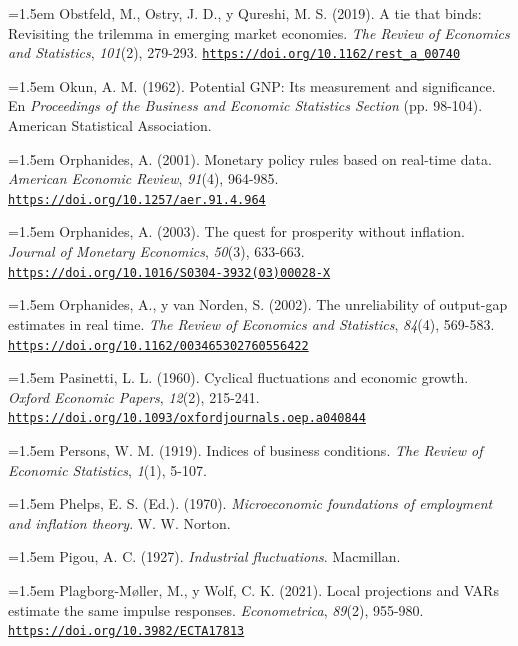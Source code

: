 \documentclass[10pt,a4paper]{article}
\begin{document}
\noindent\hangindent=1.5em Obstfeld, M., Ostry, J. D., y Qureshi, M. S. (2019). A tie that binds: Revisiting the trilemma in emerging market economies. \textit{The Review of Economics and Statistics}, \textit{101}(2), 279-293. \href{https://doi.org/10.1162/rest_a_00740}{\nolinkurl{https://doi.org/10.1162/rest_a_00740}}

\noindent\hangindent=1.5em Okun, A. M. (1962). Potential GNP: Its measurement and significance. En \textit{Proceedings of the Business and Economic Statistics Section} (pp. 98-104). American Statistical Association.

\noindent\hangindent=1.5em Orphanides, A. (2001). Monetary policy rules based on real-time data. \textit{American Economic Review}, \textit{91}(4), 964-985. \href{https://doi.org/10.1257/aer.91.4.964}{\nolinkurl{https://doi.org/10.1257/aer.91.4.964}}

\noindent\hangindent=1.5em Orphanides, A. (2003). The quest for prosperity without inflation. \textit{Journal of Monetary Economics}, \textit{50}(3), 633-663. \href{https://doi.org/10.1016/S0304-3932(03)00028-X}{\nolinkurl{https://doi.org/10.1016/S0304-3932(03)00028-X}}

\noindent\hangindent=1.5em Orphanides, A., y van Norden, S. (2002). The unreliability of output-gap estimates in real time. \textit{The Review of Economics and Statistics}, \textit{84}(4), 569-583. \href{https://doi.org/10.1162/003465302760556422}{\nolinkurl{https://doi.org/10.1162/003465302760556422}}

{\sloppy\noindent\hangindent=1.5em Pasinetti, L. L. (1960). Cyclical fluctuations and economic growth. \textit{Oxford Economic Papers}, \textit{12}(2), 215-241. \href{https://doi.org/10.1093/oxfordjournals.oep.a040844}{\nolinkurl{https://doi.org/10.1093/oxfordjournals.oep.a040844}}\par}

\noindent\hangindent=1.5em Persons, W. M. (1919). Indices of business conditions. \textit{The Review of Economic Statistics}, \textit{1}(1), 5-107.

\noindent\hangindent=1.5em Phelps, E. S. (Ed.). (1970). \textit{Microeconomic foundations of employment and inflation theory}. W. W. Norton.

\noindent\hangindent=1.5em Pigou, A. C. (1927). \textit{Industrial fluctuations}. Macmillan.

\noindent\hangindent=1.5em Plagborg-Møller, M., y Wolf, C. K. (2021). Local projections and VARs estimate the same impulse responses. \textit{Econometrica}, \textit{89}(2), 955-980. \href{https://doi.org/10.3982/ECTA17813}{\nolinkurl{https://doi.org/10.3982/ECTA17813}}
\end{document}
